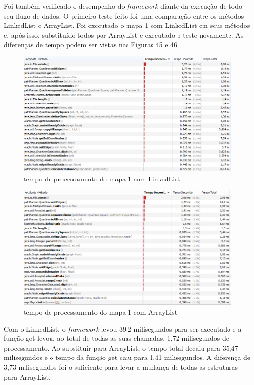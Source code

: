 Foi também verificado o desempenho do \textit{framework} diante da execução de todo seu fluxo de dados. O primeiro teste feito foi uma comparação entre os métodos LinkedList e ArrayList. Foi executado o mapa 1 com LinkedList em seus métodos e, após isso, substituído todos por ArrayList e executado o teste novamente. As diferenças de tempo podem ser vistas nas Figuras 45 e 46.

\begin{figure}[h]
	\centering
	\label{fig45}
		\includegraphics[keepaspectratio=true,scale=0.6]{figuras/link.PNG}
	\caption{tempo de processamento do mapa 1 com LinkedList}
\end{figure}

\begin{figure}[h]
	\centering
	\label{fig46}
		\includegraphics[keepaspectratio=true,scale=0.6]{figuras/array.PNG}
	\caption{tempo de processamento do mapa 1 com ArrayList}
\end{figure}

Com o LinkedList, o \textit{framework} levou 39,2 milisegundos para ser executado e a função get levou, ao total de todas as suas chamadas, 1,72 milisegundos de processamento. Ao substituir para ArrayList, o tempo total decaiu para 35,47 milisegundos e o tempo da função get caiu para 1,41 milisegundos. A diferença de 3,73 milisegundos foi o suficiente para levar a mudança de todas as estruturas para ArrayList.

